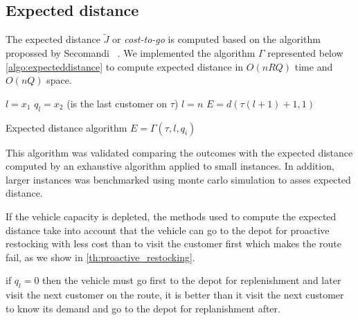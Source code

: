 \subsection{Expected distance}\label{sec:expecteddistance}

The expected distance $\tilde{J}$ or \textit{cost-to-go} is computed based on the algorithm propossed by Secomandi ~\cite{secomandi_rollout_2001}. We implemented the algorithm $\Gamma$ represented below \ref{algo:expecteddistance} to compute expected distance in $O(nRQ)$ time and $O(nQ)$ space.

\begin{algorithm}
$l = x_1$\;
$q_l = x_2$\;
\If(is the last customer on $\tau$){ $l = n$ }{%
  $E = d(\tau(l+1)+1,1)$\;%
}

\caption{Expected distance algorithm $E = \Gamma(\tau,l,q_i)$}\label{algo:expecteddistance}
\end{algorithm}

This algorithm was validated comparing the outcomes with the expected distance computed by an exhaustive algorithm applied to small instances. In addition, larger instances was benchmarked using monte carlo simulation to asses expected distance.

If the vehicle capacity is depleted, the methods used to compute the expected distance take into account that the vehicle can go to the depot for proactive restocking with less cost than to visit the customer first which makes the route fail, as we show in \ref{th:proactive_restocking}.

\begin{theorem}\label{th:proactive_restocking}%
 if $q_l=0$ then the vehicle must go first to the depot for replenishment and later visit the next customer on the route, it is better than it visit the next customer to know its demand and go to the depot for replanishment after.
\end{theorem}

